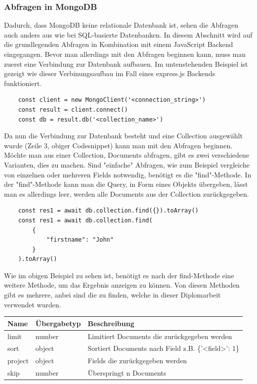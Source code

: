 \subsubsection{Abfragen in MongoDB}
Dadurch, dass MongoDB keine relationale Datenbank ist, sehen die Abfragen auch anders aus wie bei SQL-basierte Datenbanken. In diesem Abschnitt wird auf die grundlegenden Abfragen in Kombination mit einem JavaScript Backend eingegangen. Bevor man allerdings mit den Abfragen beginnen kann, muss man zuerst eine Verbindung zur Datenbank aufbauen. Im untenstehenden Beispiel ist gezeigt wie dieser Verbinungsaufbau im Fall eines express.js Backends funktioniert.
\begin{lstlisting}
    const client = new MongoClient('<connection_string>')
    const result = client.connect()
    const db = result.db('<collection_name>')
\end{lstlisting}
Da nun die Verbindung zur Datenbank besteht und eine Collection ausgewählt wurde (Zeile 3, obiger Codesnippet) kann man mit den Abfragen beginnen.
\newline
Möchte man aus einer Collection, Documents abfragen, gibt es zwei verschiedene Varianten, dies zu machen. Sind "einfache" Abfragen, wie zum Beispiel vergleiche von einzelnen oder mehreren Fields notwendig, benötigt es die "find"-Methode. In der "find"-Methode kann man die Query, in Form eines Objekts übergeben, lässt man es allerdings leer, werden alle Documents aus der Collection zurückgegeben.
\begin{lstlisting}
    const res1 = await db.collection.find({}).toArray()
    const res1 = await db.collection.find(
        {
            "firstname": "John"
        }
    ).toArray()
\end{lstlisting}
Wie im obigen Beispiel zu sehen ist, benötigt es nach der find-Methode eine weitere Methode, um das Ergebnis anzeigen zu können. Von diesen Methoden gibt es mehrere, anbei sind die zu finden, welche in dieser Diplomarbeit verwendet wurden.
\begin{center}
    \begin{tabular}{ | m{3cm} | m{2.3cm}| m{8cm} | } 
        \hline
        Name & Übergabetyp & Beschreibung \\ [0.5ex] 
        \hline\hline
        limit & number & Limitiert Documents die zurückgegeben werden \\
        \hline
        sort & object & Sortiert Documents nach Field z.B. \{'<field>': 1\} \\
        \hline
        project & object & Fields die zurückgegeben werden \\
        \hline
        skip & number & Überspringt n Documents \\
        \hline
    \end{tabular}
\end{center}
